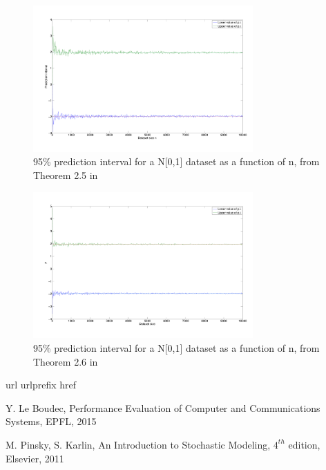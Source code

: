 \documentclass[10pt]{article}
\begin{document}
\begin{figure}
  \centering
  \includegraphics[width=0.75\textwidth]{images/hw1_4_d_norm_order.pdf}
  \caption{95\% prediction interval for a N[0,1] dataset as a function of n, from Theorem 2.5 in \cite{leb}}
  \label{fig:pi_norm}
\end{figure}

\begin{figure}
  \centering
  \includegraphics[width=0.75\textwidth]{images/hw1_4_d_norm.pdf}
  \caption{95\% prediction interval for a N[0,1] dataset as a function of n, from Theorem 2.6 in \cite{leb}}
  \label{fig:pi_norm_th}
\end{figure}


\clearpage

\begin{thebibliography}{10}
\expandafter\ifx\csname url\endcsname\relax
  \def\url#1{\texttt{#1}}\fi
\expandafter\ifx\csname urlprefix\endcsname\relax\def\urlprefix{URL}\fi
\expandafter\ifx\csname href\endcsname\relax
  \def\href#1#2{#2} \def\path#1{#1}\fi


Y. Le Boudec, Performance Evaluation of Computer and Communications Systems, EPFL, 2015

M. Pinsky, S. Karlin, An Introduction to Stochastic Modeling, $4^{th}$ edition, Elsevier, 2011


\end{thebibliography}
\end{document}

